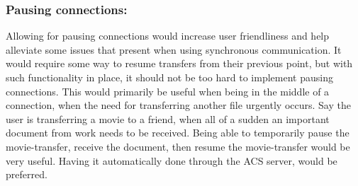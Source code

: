 \subsubsection*{Pausing connections:}
Allowing for pausing connections would increase user friendliness and help alleviate some issues that present when using synchronous communication. It would require some way to resume transfers from their previous point, but with such functionality in place, it should not be too hard to implement pausing connections. This would primarily be useful when being in the middle of a connection, when the need for transferring another file urgently occurs. Say the user is transferring a movie to a friend, when all of a sudden an important document from work needs to be received. Being able to temporarily pause the movie-transfer, receive the document, then resume the movie-transfer would be very useful. Having it automatically done through the ACS server, would be preferred.
